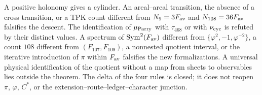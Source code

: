 A positive holonomy gives a cylinder. An areal--areal transition, the absence of a cross transition, or a TPK count different from \(N_9=3F_{\rm av}\) and \(N_{108}=36F_{\rm av}\) falsifies the descent. The identification of \(\mu_{\rm Parry}\) with \(\tau_{468}\) or with \(\nu_{\rm cyc}\) is refuted by their distinct values. A spectrum of \(\operatorname{Sym}^2(F_{\rm av})\) different from \(\{\varphi^2,-1,\varphi^{-2}\}\), a count \(108\) different from \((F_{107},F_{109})\), a nonnested quotient interval, or the iterative introduction of \(\pi\) within \(F_{\rm av}\) falsifies the new formalizations. A universal physical identification of the quotient without a map from sheets to observables lies outside the theorem. The delta of the four rules is closed; it does not reopen \(\pi\), \(\varphi\), \(C^*\), or the extension--route--ledger--character junction.

